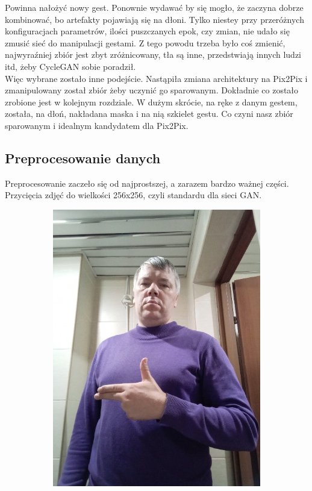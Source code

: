 \documentclass[12pt]{article}
\begin{document}
\begin{sloppypar}
{{    Powinna nałożyć nowy gest. Ponownie wydawać by się mogło, że zaczyna dobrze kombinować, bo artefakty pojawiają się na dłoni. 
    Tylko niestey przy przeróżnych konfiguracjach parametrów, ilości puszczanych epok, czy zmian, nie udało się zmusić sieć do manipulacji gestami.
    Z tego powodu trzeba było coś zmienić, najwyraźniej zbiór jest zbyt zróżnicowany, tła są inne, przedstwiają innych ludzi itd, żeby CycleGAN sobie poradził. \\
    Więc wybrane zostało inne podejście. Nastąpiła zmiana architektury na Pix2Pix i zmanipulowany został zbiór żeby uczynić go sparowanym. 
    Dokładnie co zostało zrobione jest w kolejnym rozdziale. W dużym skrócie, na ręke z danym gestem, została, na dłoń, nakładana maska i na nią szkielet gestu.
    Co czyni nasz zbiór sparowanym i idealnym kandydatem dla Pix2Pix.
  }
  \subsection{Preprocesowanie danych}
  {
    Preprocesowanie zaczeło się od najprostszej, a zarazem bardzo ważnej części. Przycięcia zdjęć do wielkości 256x256, czyli standardu dla sieci GAN.
    \begin{figure}
      \begin{subfigure}{.5\textwidth}
        \centering
        \includegraphics[width=.8\linewidth]{orig.jpg}

\end{subfigure}
\end{figure}}}
\end{sloppypar}
\end{document}
